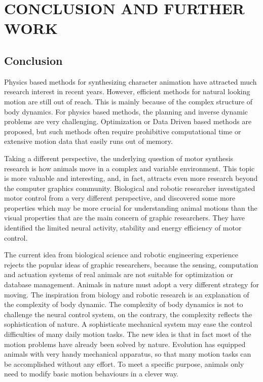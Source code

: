 \def\baselinestretch{1}
\chapter{CONCLUSION AND FURTHER WORK}
\label{chap:con}
\graphicspath{{Conclusions/ConclusionsFigs/EPS/}{Conclusions/ConclusionsFigs/}}


\def\baselinestretch{1.66}

\section{Conclusion}

Physics based methods for synthesizing character animation have attracted much research interest in recent years. 
However, efficient methods for natural looking motion are still out of reach. This is mainly because of the complex structure of body dynamics. 
For physics based methods, the planning and inverse dynamic problems are very challenging. 
Optimization or Data Driven based methods are proposed, but such methods often require prohibitive computational time or extensive motion data that easily runs out of memory.

Taking a different perspective, the underlying question of motor synthesis research is how animals move in a complex and variable environment. This topic is more valuable and interesting, and,  in fact, attracts even more research beyond the computer graphics community. 
Biological and robotic researcher investigated  motor control from a very different perspective, and discovered some more properties which may be more crucial for understanding animal motions than the visual properties that are  the  main concern of graphic researchers. 
They have identified the limited neural activity, stability and energy efficiency of motor control.

The current idea from biological science and robotic engineering experience rejects the popular ideas of graphic researchers, because the sensing, computation and actuation systems of real animals are not suitable for optimization or database management. 
Animals in nature must adopt a very different strategy for moving. 
The inspiration from biology and robotic research is an explanation of the complexity of body dynamic. 
The complexity of body dynamics is not to challenge the neural control system, on the contrary, the complexity reflects the sophistication of nature. 
A sophisticate mechanical system may ease the control difficulties of many daily motion tasks. 
The new idea is that in fact most of the motion problems have already been solved by nature.
Evolution has equipped animals with very handy mechanical apparatus, so that many motion tasks can be accomplished without any effort. 
To meet a specific purpose, animals only need to modify basic motion behaviours in a clever way.

